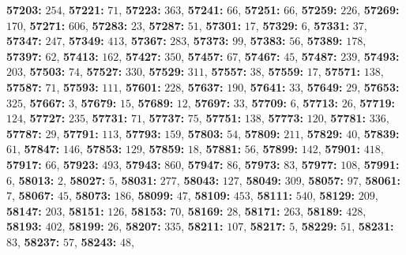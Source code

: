 \textsf{\bfseries 57203:} $254$, \textsf{\bfseries 57221:} $71$, \textsf{\bfseries 57223:} $363$, \textsf{\bfseries 57241:} $66$, \textsf{\bfseries 57251:} $66$, \textsf{\bfseries 57259:} $226$, \textsf{\bfseries 57269:} $170$, \textsf{\bfseries 57271:} $606$, \textsf{\bfseries 57283:} $23$, \textsf{\bfseries 57287:} $51$, \textsf{\bfseries 57301:} $17$, \textsf{\bfseries 57329:} $6$, \textsf{\bfseries 57331:} $37$, \textsf{\bfseries 57347:} $247$, \textsf{\bfseries 57349:} $413$, \textsf{\bfseries 57367:} $283$, \textsf{\bfseries 57373:} $99$, \textsf{\bfseries 57383:} $56$, \textsf{\bfseries 57389:} $178$, \textsf{\bfseries 57397:} $62$, \textsf{\bfseries 57413:} $162$, \textsf{\bfseries 57427:} $350$, \textsf{\bfseries 57457:} $67$, \textsf{\bfseries 57467:} $45$, \textsf{\bfseries 57487:} $239$, \textsf{\bfseries 57493:} $203$, \textsf{\bfseries 57503:} $74$, \textsf{\bfseries 57527:} $330$, \textsf{\bfseries 57529:} $311$, \textsf{\bfseries 57557:} $38$, \textsf{\bfseries 57559:} $17$, \textsf{\bfseries 57571:} $138$, \textsf{\bfseries 57587:} $71$, \textsf{\bfseries 57593:} $111$, \textsf{\bfseries 57601:} $228$, \textsf{\bfseries 57637:} $190$, \textsf{\bfseries 57641:} $33$, \textsf{\bfseries 57649:} $29$, \textsf{\bfseries 57653:} $325$, \textsf{\bfseries 57667:} $3$, \textsf{\bfseries 57679:} $15$, \textsf{\bfseries 57689:} $12$, \textsf{\bfseries 57697:} $33$, \textsf{\bfseries 57709:} $6$, \textsf{\bfseries 57713:} $26$, \textsf{\bfseries 57719:} $124$, \textsf{\bfseries 57727:} $235$, \textsf{\bfseries 57731:} $71$, \textsf{\bfseries 57737:} $75$, \textsf{\bfseries 57751:} $138$, \textsf{\bfseries 57773:} $120$, \textsf{\bfseries 57781:} $336$, \textsf{\bfseries 57787:} $29$, \textsf{\bfseries 57791:} $113$, \textsf{\bfseries 57793:} $159$, \textsf{\bfseries 57803:} $54$, \textsf{\bfseries 57809:} $211$, \textsf{\bfseries 57829:} $40$, \textsf{\bfseries 57839:} $61$, \textsf{\bfseries 57847:} $146$, \textsf{\bfseries 57853:} $129$, \textsf{\bfseries 57859:} $18$, \textsf{\bfseries 57881:} $56$, \textsf{\bfseries 57899:} $142$, \textsf{\bfseries 57901:} $418$, \textsf{\bfseries 57917:} $66$, \textsf{\bfseries 57923:} $493$, \textsf{\bfseries 57943:} $860$, \textsf{\bfseries 57947:} $86$, \textsf{\bfseries 57973:} $83$, \textsf{\bfseries 57977:} $108$, \textsf{\bfseries 57991:} $6$, \textsf{\bfseries 58013:} $2$, \textsf{\bfseries 58027:} $5$, \textsf{\bfseries 58031:} $277$, \textsf{\bfseries 58043:} $127$, \textsf{\bfseries 58049:} $309$, \textsf{\bfseries 58057:} $97$, \textsf{\bfseries 58061:} $7$, \textsf{\bfseries 58067:} $45$, \textsf{\bfseries 58073:} $186$, \textsf{\bfseries 58099:} $47$, \textsf{\bfseries 58109:} $453$, \textsf{\bfseries 58111:} $540$, \textsf{\bfseries 58129:} $209$, \textsf{\bfseries 58147:} $203$, \textsf{\bfseries 58151:} $126$, \textsf{\bfseries 58153:} $70$, \textsf{\bfseries 58169:} $28$, \textsf{\bfseries 58171:} $263$, \textsf{\bfseries 58189:} $428$, \textsf{\bfseries 58193:} $402$, \textsf{\bfseries 58199:} $26$, \textsf{\bfseries 58207:} $335$, \textsf{\bfseries 58211:} $107$, \textsf{\bfseries 58217:} $5$, \textsf{\bfseries 58229:} $51$, \textsf{\bfseries 58231:} $83$, \textsf{\bfseries 58237:} $57$, \textsf{\bfseries 58243:} $48$, 
